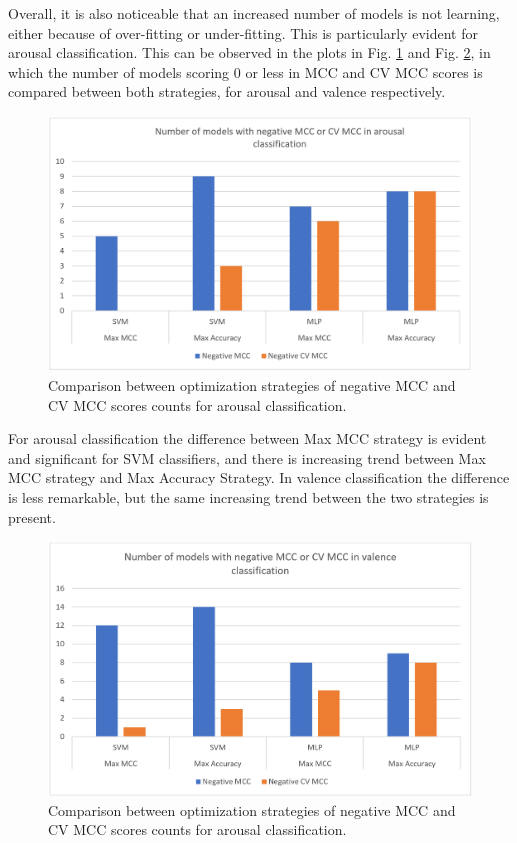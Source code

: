 Overall, it is also noticeable that an increased number of models is not learning, either because of over-fitting or under-fitting. This is particularly evident for arousal classification. This can be observed in the plots in Fig. \ref{fig:arousal_strategy_comparison} and Fig. \ref{fig:valence_strategy_comparison}, in which the number of models scoring 0 or less in \ac{MCC} and \ac{CV MCC} scores is compared between both strategies, for arousal and valence respectively.

\begin{figure}[h!]
\includegraphics[width=12cm]{img/results/arousal_strategy_comparison.png}
\centering
\caption{Comparison between optimization strategies of negative MCC and CV MCC scores counts for arousal classification.} \label{fig:arousal_strategy_comparison}
\end{figure}

For arousal classification the difference between Max MCC strategy is evident and significant for \ac{SVM} classifiers, and there is increasing trend between Max MCC strategy and Max Accuracy Strategy. In valence classification the difference is less remarkable, but the same increasing trend between the two strategies is present.

\begin{figure}[h!]
\includegraphics[width=12cm]{img/results/valence_strategy_comparison.png}
\centering
\caption{Comparison between optimization strategies of negative MCC and CV MCC scores counts for arousal classification.} \label{fig:valence_strategy_comparison}
\end{figure}

